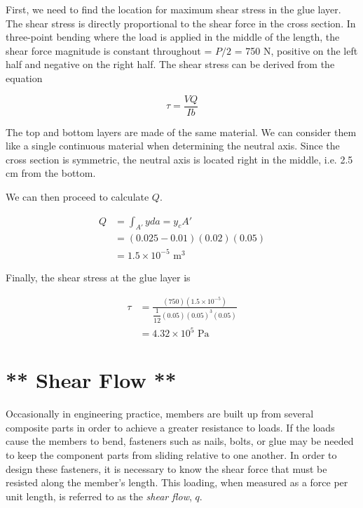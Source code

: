 \documentclass[
10pt,
a4paper,
openany,
svgnames,
]{kaobook} %
\begin{document}
\begin{solution}
  First, we need to find the location for maximum shear stress in the glue layer. The shear stress is directly proportional to the shear force in the cross section. In three-point bending where the load is applied in the middle of the length, the shear force magnitude is constant throughout = $P/2$ = 750 N, positive on the left half and negative on the right half. The shear stress can be derived from the equation

  \begin{equation*}
    \tau  = \frac{VQ}{Ib}
  \end{equation*}

  The top and bottom layers are made of the same material. We can consider them like a single continuous material when determining the neutral axis. Since the cross section is symmetric, the neutral axis is located right in the middle, i.e. 2.5 cm from the bottom.

  We can then proceed to calculate $Q$.

  \begin{align*}
    Q &= \int_{A'} yda = y_cA' \\
      &= (0.025 - 0.01)(0.02)(0.05) \\
      &= 1.5 \times 10^{-5} \text{ m}^3
  \end{align*}

  Finally, the shear stress at the glue layer is

  \begin{align*}
    \tau &= \frac{(750)(1.5 \times 10^{-5})}{\dfrac{1}{12}(0.05)(0.05)^3(0.05)} \\ 
         &= 4.32 \times 10^5 \text{ Pa}
  \end{align*}
\end{solution}
	
\section{** Shear Flow **}

Occasionally in engineering practice, members are built up from several composite parts in order to achieve a greater resistance to loads. If the loads cause the members to bend, fasteners such as nails, bolts, or glue may be needed to keep the component parts from sliding relative to one another. In order to design these fasteners, it is necessary to know the shear force that must be resisted along the member’s length. This loading, when measured as a force per unit length, is referred to as the \emph{shear flow}, $q$.
\end{document}
